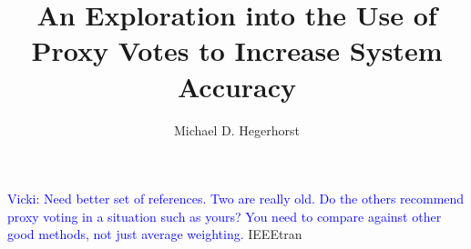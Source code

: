 \documentclass[cs,msthesis]{usuthesis}
\author{Michael D. Hegerhorst}
\title{An Exploration into the Use of Proxy Votes to Increase System Accuracy}
\newcommand{\vicki}[1]{\textcolor{blue}{Vicki: #1}}
\begin{document}
    \preliminaries   %

    \maketitle
    \makecopyright        %

    
    

    \tableofcontents
    \listoftables
    \listoffigures

    \body  %
    
    
    
    
    \vicki{Need better set of references.  Two are really old.  Do the others recommend proxy voting in a situation such as yours?  You need to compare against other good methods, not just average weighting.}
    {IEEEtran}


    
    

\end{document}
